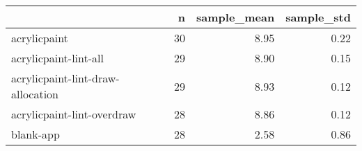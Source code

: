 \begin{tabular}{lrrr}
\toprule
{} &   n &  sample\_mean &  sample\_std \\
\midrule
acrylicpaint                      &  30 &         8.95 &        0.22 \\
acrylicpaint-lint-all             &  29 &         8.90 &        0.15 \\
acrylicpaint-lint-draw-allocation &  29 &         8.93 &        0.12 \\
acrylicpaint-lint-overdraw        &  28 &         8.86 &        0.12 \\
blank-app                         &  28 &         2.58 &        0.86 \\
\bottomrule
\end{tabular}
